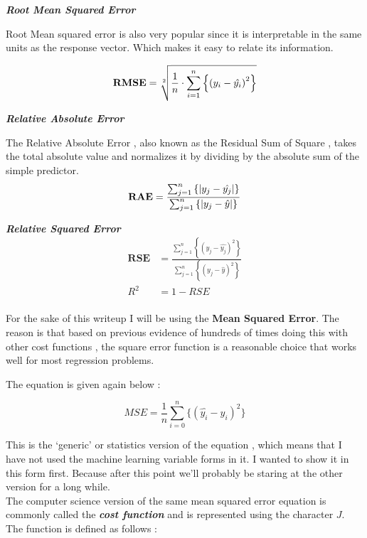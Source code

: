 \textbf{\textit{Root Mean Squared Error}}

Root Mean squared error is also very popular since it is interpretable in the
same units as the response vector. Which makes it easy to relate its
information.

\[
	\textbf{RMSE} =
	\sqrt[2]
	{
		\frac{1}{n}
		\cdot \sum_{i=1}^{n}
		\left\{
			\left(
				y_i - \hat{y_i}
			\right)^2
		\right\}
	}
	\\
\]

\textbf{\textit{Relative Absolute Error}}

The Relative Absolute Error , also known as the Residual Sum of Square , takes
the total absolute value and normalizes it by dividing by the absolute sum of
the simple predictor. \\

\[
	\textbf{RAE} =
		\frac
		{
		\sum_{j=1}^{n}
		\left\{
			|y_{j} - \hat{y_j}|
		\right\}
		}
		{
		\sum_{j=1}^{n}
		\left\{
			|y_{j} - \hat{y}|
		\right\}
	}
	\\
\]

\textbf{\textit{Relative Squared Error }}
\[
\begin{aligned} 
	\textbf{RSE} & =
	\frac
	{ 
	\sum_{j=1}^{n}
	\left\{
		\left(
			y_{j} - \hat{y_j}
		\right)^2
	\right\}
	}
	{
	\sum_{j=1}^{n}
	\left\{
		\left(
			y_{j} - \hat{y}
		\right)^2
	\right\}
	}
	\\
	R^2 & = 1 - RSE \\
\end{aligned}
\]

For the sake of this writeup I will be using the \textbf{Mean Squared Error}.
The reason is that based on previous evidence of hundreds of times doing this
with other cost functions , the square error function is a reasonable choice
that works well for most regression problems.

The equation is given again below :

\[ MSE = \frac{1}{n} \sum_{i=0}^{n} \{ ( \hat{y_{i}} - y_{i} ) ^{2} \} \]

This is the `generic' or statistics version of the equation , which means that I
have not used the machine learning variable forms in it. I wanted to show it in
this form first. Because after this point we'll probably be staring at the other
version for a long while. \\

The computer science version of the same mean squared error equation is commonly
called the \textbf{\textit{cost function}} and is represented using the
character \( J \). The function is defined as follows :

